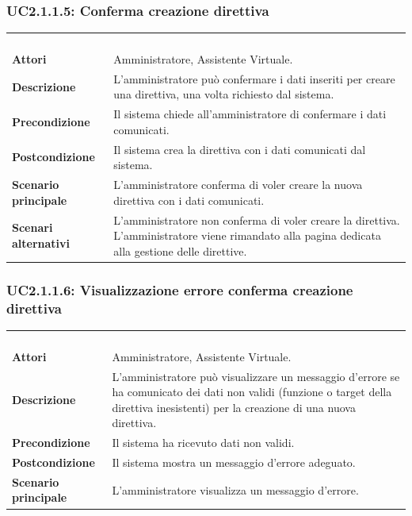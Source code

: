 \subsubsection{UC2.1.1.5: Conferma creazione direttiva}
\label{UC2.1.1.5}
\begin{longtable}{l|p{10cm}}
\rowcolor[gray]{0.8} \multicolumn{2}{c}{} \\
\rowcolor[gray]{0.8} \multicolumn{2}{c}{\textbf{UC2.1.1.5 - Conferma creazione direttiva}} \\
\rowcolor[gray]{0.8} \multicolumn{2}{c}{} \\
\hline
&\\
\textbf{Attori} & Amministratore, Assistente Virtuale.\\[7pt]
\textbf{Descrizione} & L'amministratore può confermare i dati inseriti per creare una direttiva, una volta richiesto dal sistema.\\[7pt]
\textbf{Precondizione} & Il sistema chiede all'amministratore di confermare i dati comunicati.\\[7pt]
\textbf{Postcondizione} & Il sistema crea la direttiva con i dati comunicati dal sistema.\\[7pt]
\textbf{Scenario principale} &L'amministratore conferma di voler creare la nuova direttiva con i dati comunicati.\\[7pt]
\textbf{Scenari alternativi} & L'amministratore non conferma di voler creare la direttiva. L'amministratore viene rimandato alla pagina dedicata alla gestione delle direttive.\\[7pt]\hline
\end{longtable}

\subsubsection{UC2.1.1.6: Visualizzazione errore conferma creazione direttiva}
\label{UC2.1.1.6}
\begin{longtable}{l|p{10cm}}
\rowcolor[gray]{0.8} \multicolumn{2}{c}{} \\
\rowcolor[gray]{0.8} \multicolumn{2}{c}{\textbf{UC2.1.1.6 - Visualizzazione errore conferma creazione direttiva}} \\
\rowcolor[gray]{0.8} \multicolumn{2}{c}{} \\
\hline
&\\
\textbf{Attori} & Amministratore, Assistente Virtuale.\\[7pt]
\textbf{Descrizione} & L'amministratore può visualizzare un messaggio d'errore se ha comunicato dei dati non validi (funzione o target della direttiva inesistenti) per la creazione di una nuova direttiva.
\\[7pt]
\textbf{Precondizione} & Il sistema ha ricevuto dati non validi.\\[7pt]
\textbf{Postcondizione} & Il sistema mostra un messaggio d'errore adeguato.\\[7pt]
\textbf{Scenario principale} &L'amministratore visualizza un messaggio d'errore.\\[7pt]\hline
\end{longtable}

